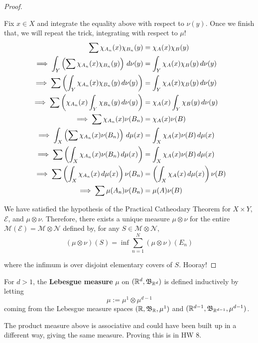 \documentclass[11pt,leqno,oneside]{amsbook}
\numberwithin{thm}{section}
\newcommand{\M}{\mathcal{M}} %
\newcommand{\E}{\mathcal{E}}
\newcommand{\cN}{\mathcal{N}}
\newcommand{\x}{\times}
\newcommand{\ox}{\otimes}
\renewcommand{\de}{\textbf} %
\begin{document}
\begin{proof}
\begin{enumerate}[label=(\arabic{*})]
\begin{itemize}
      Fix $x \in X$ and integrate the equality above with respect to
      $\nu(y)$.  Once we finish that, we will repeat the trick, integrating with respect to $\mu$!
      \begin{align*}
        \sum \chi_{A_n}(x)\chi_{B_n}(y) &= \chi_A(x)\chi_B(y) \\
        \implies \int_Y\left(\sum \chi_{A_n}(x)\chi_{B_n}(y)\right)\, d\nu(y) &= \int_Y \chi_A(x)\chi_B(y) \, d\nu(y) \\
        \implies \sum \left(\int_Y\chi_{A_n}(x)\chi_{B_n}(y)\, d\nu(y)\right) &= \int_Y \chi_A(x)\chi_B(y) \, d\nu(y) \\
        \implies \sum \left(\chi_{A_n}(x)\int_Y\chi_{B_n}(y)\, d\nu(y)\right) &= \chi_A(x)\int_Y \chi_B(y) \, d\nu(y) \\
        \implies \sum \chi_{A_n}(x)\nu(B_n) &= \chi_A(x)\nu(B) \\
        \implies \int_X \left(\sum \chi_{A_n}(x)\nu(B_n)\right) \, d\mu(x) &= \int_X \chi_A(x)\nu(B)\, d\mu(x) \\
        \implies \sum \left(\int_X \chi_{A_n}(x)\nu(B_n) \, d\mu(x)\right) &= \int_X \chi_A(x)\nu(B)\, d\mu(x) \\
        \implies \sum \left(\int_X \chi_{A_n}(x) \, d\mu(x)\right)\nu(B_n) &= \left(\int_X \chi_A(x)\, d\mu(x)\right)\nu(B) \\
        \implies \sum \mu(A_n)\nu(B_n) &= \mu(A)\nu(B)
      \end{align*}
    \end{itemize}
  \end{enumerate}
  We have satisfied the hypothesis of the Practical Catheodary Theorem for $X \x Y$, $\E$, and $\mu \ox \nu$.  Therefore, there exists a unique measure $\mu\ox\nu$ for the entire $\M(\E) = \M\ox\cN$ defined by, for any $S \in \M\ox\cN$,
  $$(\mu\ox\nu)(S) = \inf\sum_{n=1}^N (\mu\ox\nu)(E_n)$$

  where the infimum is over disjoint elementary covers of $S$.  Hooray!
\end{proof}
\begin{defn}
  For $d > 1$, the \de{Lebesgue measure} $\mu$ on $({\mathbb R}^d, \mathfrak{B}_{{\mathbb R}^d})$ is defined inductively by letting $$\mu := \mu^1 \ox \mu^{d-1}$$ coming from the Lebesgue measure spaces $({\mathbb R}, \mathfrak{B}_{{\mathbb R}}, \mu^1)$ and $({\mathbb R}^{d-1}, \mathfrak{B}_{{\mathbb R}^{d-1}}, \mu^{d-1})$.
\end{defn}
\begin{thm}
  The product measure above is associative and could have been built up in a different way, giving the same measure.  Proving this is in HW 8.
\end{thm}
\end{document}
